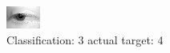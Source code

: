 \begin{figure}[h!]
\begin{center}
\includegraphics[width=0.60\columnwidth]{figures/ID2613_class_3_target_4.png}
\end{center}
\caption{ Classification: 3 actual target: 4}
\label{fig:ID2613_class_3_target_4}
\end{figure}
